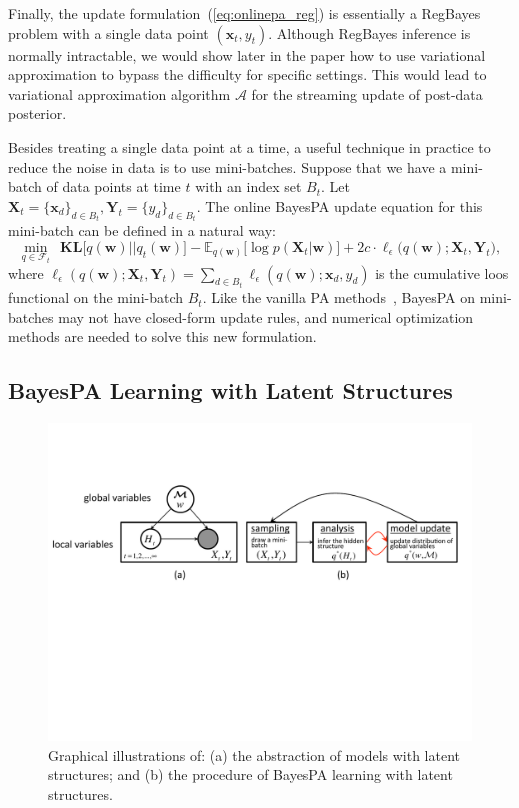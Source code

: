 \documentclass[twoside,11pt]{article}
\newcommand{\xv}{\bm{x}}
\newcommand{\Xv}{\bm{X}}
\newcommand{\Yv}{\bm{Y}}
\newcommand{\algo}{\mathcal{A}}
\newcommand{\wv}{\bm{w}}
\newcommand{\KL}{\textbf{KL}}
\begin{document}
Finally, the update formulation~(\ref{eq:onlinepa_reg}) is essentially a RegBayes problem with a single data point $(\xv_t, y_t)$. Although RegBayes inference is normally intractable, we would show later in the paper how to use variational approximation to bypass the difficulty for specific settings. This would lead to variational approximation algorithm $\algo$ for the streaming update of post-data posterior.

Besides treating a single data point at a time, a useful technique in practice to reduce the noise in data is to use mini-batches. Suppose that we have a mini-batch of data points at time $t$ with an index set $B_t$. Let $\Xv_t = \{\xv_d\}_{d \in B_t}, \Yv_t = \{y_{d}\}_{d \in B_t}$. The online BayesPA update equation for this mini-batch can be defined in a natural way:
%
\begin{equation*} %
\underset{q \in \mathcal{F}_t}{\operatorname{min}}{~ ~\KL\Big[q(\bm{w}) || q_{t}(\bm{w}) \Big]-\mathbb{E}_{q(\bm{w})}\Big[\log p(\Xv_t | \bm{w})\Big] + 2c \cdot \ell_\epsilon\Big(q(\wv); \Xv_t, \Yv_t\Big)},
\end{equation*}
%
where $\ell_\epsilon(q(\wv); \Xv_t, \Yv_t) = \sum_{d \in B_t}{\ell_\epsilon(q(\wv); \xv_d, y_d)}$ is the cumulative loos functional on the mini-batch $B_t$. Like the vanilla PA methods~\citep{crammer2006pa}, BayesPA on mini-batches may not have closed-form update rules, and numerical optimization methods are needed to solve this new formulation.

\subsection{BayesPA Learning with Latent Structures}\label{sec:pa_latent}

\begin{figure}
\begin{center}
\includegraphics[width=\textwidth]{graph.pdf}
\end{center}\vspace{-.4cm}
\caption{Graphical illustrations of: (a) the abstraction of models with latent structures; and (b) the procedure of BayesPA learning with latent structures.}\label{fig:LatentBayesPA}\vspace{-.4cm}
\end{figure}
\end{document}
